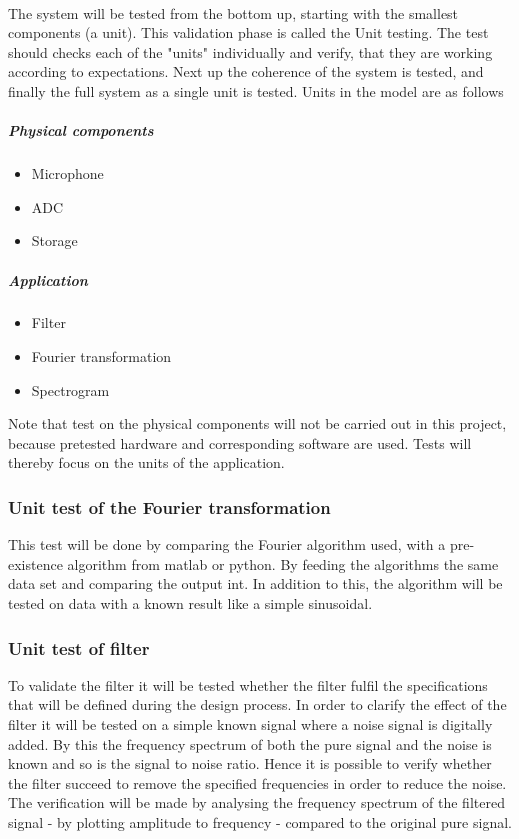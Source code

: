 \\
The system will be tested from the bottom up, starting with the smallest components (a unit). This validation phase is called the Unit testing. The test should checks each of the "units" individually and verify, that they are working according to expectations. Next up the coherence of the system is tested, and finally the full system as a single unit is tested. Units in the model are as follows
\subparagraph{Physical components}  
\begin{itemize}
	\item Microphone
	\item ADC
	\item Storage
\end{itemize}
\subparagraph{Application}
\begin{itemize}
	\item Filter
	\item Fourier transformation
	\item Spectrogram
\end{itemize}
Note that test on the physical components will not be carried out in this project, because pretested hardware and corresponding software are used. Tests will thereby focus on the units of the application.\\ 
 
\subsubsection{Unit test of the Fourier transformation}
This test will be done by comparing the Fourier algorithm used, with a pre-existence algorithm from matlab or python.
By feeding the algorithms the same data set and comparing the output int. 
In addition to this, the algorithm will be tested on data with a known result like a simple sinusoidal.

\subsubsection{Unit test of filter}
To validate the filter it will be tested whether the filter fulfil the specifications that will be defined during the design process. In order to clarify the effect of the filter it will be tested on a simple known signal where a noise signal is digitally added. By this the frequency spectrum of both the pure signal and the noise is known and so is the signal to noise ratio. Hence it is possible to verify whether the filter succeed to remove the specified frequencies in order to reduce the noise. The verification will be made by analysing the frequency spectrum of the filtered signal - by plotting amplitude to frequency - compared to the original pure signal. 


